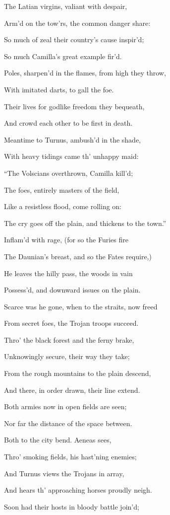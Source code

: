 The Latian virgins, valiant with despair,

Arm’d on the tow’rs, the common danger share:

So much of zeal their country’s cause inspir’d;

So much Camilla’s great example fir’d.

Poles, sharpen’d in the flames, from high they throw,

With imitated darts, to gall the foe.

Their lives for godlike freedom they bequeath,

And crowd each other to be first in death.

Meantime to Turnus, ambush’d in the shade,

With heavy tidings came th’ unhappy maid:

“The Volscians overthrown, Camilla kill’d;

The foes, entirely masters of the field,

Like a resistless flood, come rolling on:

The cry goes off the plain, and thickens to the town.”

Inflam’d with rage, (for so the Furies fire

The Daunian’s breast, and so the Fates require,)

He leaves the hilly pass, the woods in vain

Possess’d, and downward issues on the plain.

Scarce was he gone, when to the straits, now freed

From secret foes, the Trojan troops succeed.

Thro’ the black forest and the ferny brake,

Unknowingly secure, their way they take;

From the rough mountains to the plain descend,

And there, in order drawn, their line extend.

Both armies now in open fields are seen;

Nor far the distance of the space between.

Both to the city bend. Aeneas sees,

Thro’ smoking fields, his hast’ning enemies;

And Turnus views the Trojans in array,

And hears th’ approaching horses proudly neigh.

Soon had their hosts in bloody battle join’d;


